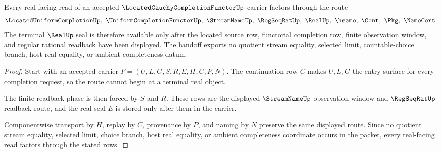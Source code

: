 \begin{theorem}
\label{thm:located-cauchy-completion-functor-real-seal-handoff}
Every real-facing read of an accepted $\LocatedCauchyCompletionFunctorUp$ carrier factors through the route
$$
\LocatedUniformCompletionUp,\ \UniformCompletionFunctorUp,\ \StreamNameUp,\ \RegSeqRatUp,\ \RealUp,\ \hsame,\ \Cont,\ \Pkg,\ \NameCert .
$$
The terminal $\RealUp$ seal is therefore available only after the located source row, functorial completion row, finite observation window, and regular rational readback have been displayed. The handoff exports no quotient stream equality, selected limit, countable-choice branch, host real equality, or ambient completeness datum.
\end{theorem}
\begin{proof}
Start with an accepted carrier $F=(U,L,G,S,R,E,H,C,P,N)$. The continuation row $C$ makes $U,L,G$ the entry surface for every completion request, so the route cannot begin at a terminal real object.

The finite readback phase is then forced by $S$ and $R$. These rows are the displayed $\StreamNameUp$ observation window and $\RegSeqRatUp$ readback route, and the real seal $E$ is stored only after them in the carrier.

Componentwise transport by $H$, replay by $C$, provenance by $P$, and naming by $N$ preserve the same displayed route. Since no quotient stream equality, selected limit, choice branch, host real equality, or ambient completeness coordinate occurs in the packet, every real-facing read factors through the stated rows.
\end{proof}




